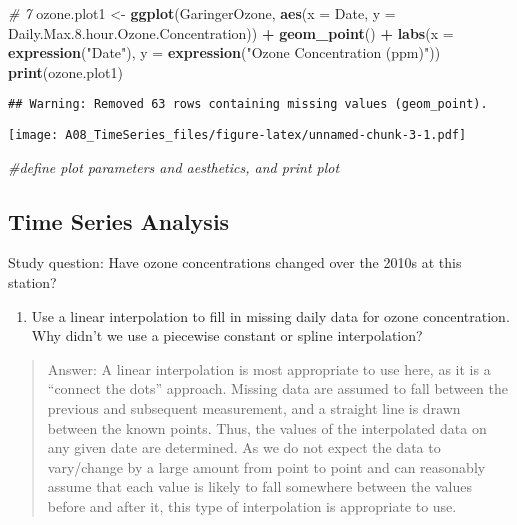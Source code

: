 \documentclass[
]{article}
\newenvironment{Shaded}{\begin{snugshade}}{\end{snugshade}}
\newcommand{\CommentTok}[1]{\textcolor[rgb]{0.56,0.35,0.01}{\textit{#1}}}
\newcommand{\DataTypeTok}[1]{\textcolor[rgb]{0.13,0.29,0.53}{#1}}
\newcommand{\FloatTok}[1]{\textcolor[rgb]{0.00,0.00,0.81}{#1}}
\newcommand{\KeywordTok}[1]{\textcolor[rgb]{0.13,0.29,0.53}{\textbf{#1}}}
\newcommand{\NormalTok}[1]{#1}
\newcommand{\OperatorTok}[1]{\textcolor[rgb]{0.81,0.36,0.00}{\textbf{#1}}}
\newcommand{\StringTok}[1]{\textcolor[rgb]{0.31,0.60,0.02}{#1}}
\providecommand{\tightlist}{%
  \setlength{\itemsep}{0pt}\setlength{\parskip}{0pt}}
\begin{document}
\begin{Shaded}
\begin{Highlighting}[]
\CommentTok{# 7}
\NormalTok{ozone.plot1 <-}
\StringTok{  }\KeywordTok{ggplot}\NormalTok{(GaringerOzone, }\KeywordTok{aes}\NormalTok{(}\DataTypeTok{x =}\NormalTok{ Date, }\DataTypeTok{y =}\NormalTok{ Daily.Max.}\FloatTok{8.}\NormalTok{hour.Ozone.Concentration)) }\OperatorTok{+}
\StringTok{    }\KeywordTok{geom_point}\NormalTok{() }\OperatorTok{+}
\StringTok{    }\KeywordTok{labs}\NormalTok{(}\DataTypeTok{x =} \KeywordTok{expression}\NormalTok{(}\StringTok{"Date"}\NormalTok{), }\DataTypeTok{y =} \KeywordTok{expression}\NormalTok{(}\StringTok{"Ozone Concentration (ppm)"}\NormalTok{))}
\KeywordTok{print}\NormalTok{(ozone.plot1)}
\end{Highlighting}
\end{Shaded}

\begin{verbatim}
## Warning: Removed 63 rows containing missing values (geom_point).
\end{verbatim}

\texttt{[image: A08\_TimeSeries\_files/figure-latex/unnamed-chunk-3-1.pdf]}

\begin{Shaded}
\begin{Highlighting}[]
\CommentTok{#define plot parameters and aesthetics, and print plot}
\end{Highlighting}
\end{Shaded}

\hypertarget{time-series-analysis}{%
\subsection{Time Series Analysis}\label{time-series-analysis}}

Study question: Have ozone concentrations changed over the 2010s at this
station?

\begin{enumerate}
\def\labelenumi{\arabic{enumi}.}
\setcounter{enumi}{7}
\tightlist
\item
  Use a linear interpolation to fill in missing daily data for ozone
  concentration. Why didn't we use a piecewise constant or spline
  interpolation?
\end{enumerate}

\begin{quote}
Answer: A linear interpolation is most appropriate to use here, as it is
a ``connect the dots'' approach. Missing data are assumed to fall
between the previous and subsequent measurement, and a straight line is
drawn between the known points. Thus, the values of the interpolated
data on any given date are determined. As we do not expect the data to
vary/change by a large amount from point to point and can reasonably
assume that each value is likely to fall somewhere between the values
before and after it, this type of interpolation is appropriate to use.
\end{quote}
\end{document}
